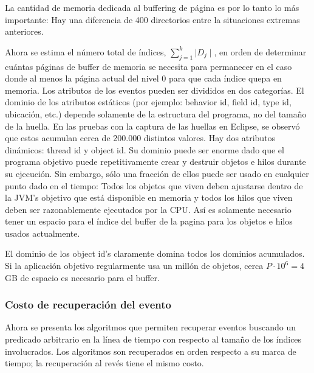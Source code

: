 \documentclass[12pt,legalpaper]{report}
\begin{document}
	La cantidad de memoria dedicada al buffering de página es por lo tanto lo más importante:  Hay una diferencia de 400 directorios entre la situaciones extremas anteriores.

	Ahora se estima el número total de índices, $\sum_{j=1}^k{\mid D_j\mid}$, en orden de determinar cuántas páginas de buffer de memoria se necesita para permanecer en el caso donde al menos la página actual del nivel 0 para que cada índice quepa en memoria.  Los atributos de los eventos pueden ser divididos en dos categorías.  El dominio de los atributos estáticos (por ejemplo: behavior id, field id, type id, ubicación, etc.) depende solamente de la estructura del programa, no del tamaño de la huella.  En las pruebas con la captura de las huellas en Eclipse, se observó que estos acumulan cerca de 200.000 distintos valores.  Hay dos atributos dinámicos: thread id y object id.  Su dominio puede ser enorme dado que el programa objetivo puede repetitivamente crear y destruir objetos e hilos durante su ejecución.  Sin embargo, sólo una fracción de ellos puede ser usado en cualquier punto dado en el tiempo:  Todos los objetos que viven deben ajustarse dentro de la JVM's objetivo que está disponible en memoria y todos los hilos que viven deben ser razonablemente ejecutados por la CPU.  Así es solamente necesario tener un espacio para el índice del buffer de la pagina para los objetos e hilos usados actualmente.

	El dominio de los  object id's claramente domina todos los dominios acumulados.  Si la aplicación objetivo regularmente usa un millón de objetos, cerca $P\cdot10^6 = 4$ GB de espacio es necesario para el buffer.


			\subsubsection{Costo de recuperación del evento}

	Ahora se presenta los algoritmos que permiten recuperar eventos buscando un predicado arbitrario en la línea de tiempo con respecto al tamaño de los índices involucrados.  Los algoritmos son recuperados en orden respecto a su marca de tiempo; la recuperación al revés tiene el mismo costo.
\end{document}
